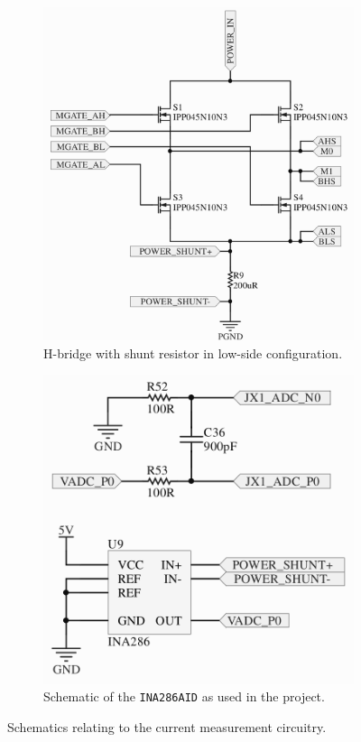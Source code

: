 \begin{figure}
	\centering
	\begin{subfigure}[b]{0.49\textwidth}
		\centering
		\includegraphics[width=\linewidth]{graphics/hbridge}
		\caption{H-bridge with shunt resistor in low-side configuration.}
		\label{sfig:hbridgeshunt}	
	\end{subfigure}
	\begin{subfigure}[b]{0.49\textwidth}
		\centering
		\includegraphics[width=\linewidth]{graphics/ina286}
		\caption{Schematic of the \texttt{INA286AID} as used in the project.}
		\label{sfig:ina286aidschematic}
	\end{subfigure}
	\caption{Schematics relating to the current measurement circuitry.}
	\label{fig:currentmeasure}
\end{figure}

